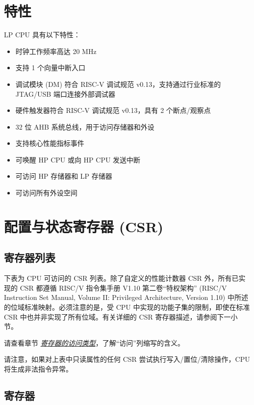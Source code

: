\documentclass[main\_\_CN.tex]{subfiles}
\begin{document}
\section{特性}
\label{sec:ulp-features}

LP CPU 具有以下特性：

\begin{itemize}
    \item 时钟工作频率高达 20 MHz
    \item 支持 1 个向量中断入口
    \item 调试模块 (DM) 符合 RISC-V 调试规范 v0.13，支持通过行业标准的 JTAG/USB 端口连接外部调试器
    \item 硬件触发器符合 RISC-V 调试规范 v0.13，具有 2 个断点/观察点
    \item 32 位 AHB 系统总线，用于访问存储器和外设
    \item 支持核心性能指标事件
    \item 可唤醒 HP CPU 或向 HP CPU 发送中断
    \item 可访问 HP 存储器和 LP 存储器
    \item 可访问所有外设空间

\end{itemize}

\section{配置与状态寄存器 (CSR)}
\hypertarget{ulp-reg-summ}{}
\subsection{寄存器列表}
\label{sec:ulp-reg-summ}


下表为 CPU 可访问的 CSR 列表。除了自定义的性能计数器 CSR 外，所有已实现的 CSR 都遵循 RISC\-/V 指令集手册 V1.10 第二卷“特权架构” (RISC\-/V Instruction Set Manual, Volume II: Privileged Architecture, Version 1.10) 中所述的位域标准映射。必须注意的是，受 CPU 中实现的功能子集的限制，即使在标准 CSR 中也并非实现了所有位域。有关详细的 CSR 寄存器描述，请参阅下一小节。

请查看章节 \hyperref[glossary-access-types]{\textit{寄存器的访问类型}}，了解“访问”列缩写的含义。



请注意，如果对上表中只读属性的任何 CSR 尝试执行写入/置位/清除操作，CPU 将生成非法指令异常。

\subsection{寄存器}
\end{document}
